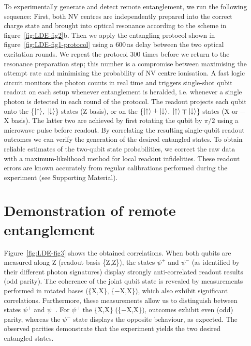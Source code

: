 To experimentally generate and detect remote entanglement, we run the following sequence: First, both NV centres are independently prepared into the correct charge state and brought into optical resonance according to the scheme in figure~\ref{fig:LDE-fig2}b. Then we apply the entangling protocol shown in figure~\ref{fig:LDE-fig1-protocol} using a 600$\,$ns delay between the two optical excitation rounds. We repeat the protocol 300 times before we return to the resonance preparation step; this number is a compromise between maximising the attempt rate and minimising the probability of NV centre ionisation. A fast logic circuit monitors the photon counts in real time and triggers single-shot qubit readout on each setup whenever entanglement is heralded, i.e. whenever a single photon is detected in each round of the protocol. The readout projects each qubit onto the \{$\left|\uparrow\right\rangle$, $\left|\downarrow\right\rangle$\} states (Z-basis), or on the \{$\left|\uparrow\right\rangle \pm \left|\downarrow\right\rangle$, $\left|\uparrow\right\rangle \mp \left|\downarrow\right\rangle$\} states (X or $-$X basis). The latter two are achieved by first rotating the qubit by $\pi/2$ using a microwave pulse before readout. By correlating the resulting single-qubit readout outcomes we can verify the generation of the desired entangled states. To obtain reliable estimates of the two-qubit state probabilities, we correct the raw data with a maximum-likelihood method for local readout infidelities. These readout errors are known accurately from regular calibrations performed during the experiment (see Supporting Material).

\section{Demonstration of remote entanglement}

Figure~\ref{fig:LDE-fig3} shows the obtained correlations. When both qubits are measured along Z (readout basis \{Z,Z\}), the states $\psi^+$ and $\psi^-$ (as identified by their different photon signatures) display strongly anti-correlated readout results (odd parity). The coherence of the joint qubit state is revealed by measurements performed in rotated bases (\{X,X\}, \{$-$X,X\}), which also exhibit significant correlations. Furthermore, these measurements allow us to distinguish between states $\psi^+$ and $\psi^-$. For $\psi^+$ the \{X,X\} (\{$-$X,X\}), outcomes exhibit even (odd) parity, whereas the $\psi^-$ state displays the opposite behaviour, as expected. The observed parities demonstrate that the experiment yields the two desired entangled states.

